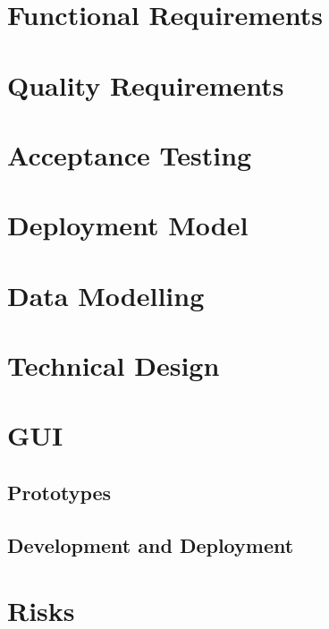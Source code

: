 \documentclass{article}
\begin{document}
	\section{Functional Requirements}
	
	\pagebreak
	
	\section{Quality Requirements}
	
	\pagebreak
	
	\section{Acceptance Testing}
	
	\pagebreak
	
	\section{Deployment Model}
	
	\pagebreak
	
	\section{Data Modelling}
	
	\pagebreak
	
	\section{Technical Design}
	
	\pagebreak
	
	\section{GUI}
	\subsection{Prototypes}
	
	
	\subsection{Development and Deployment}
	
	
	\pagebreak
	
	\section{Risks}
	
	\pagebreak
	
\end{document}
